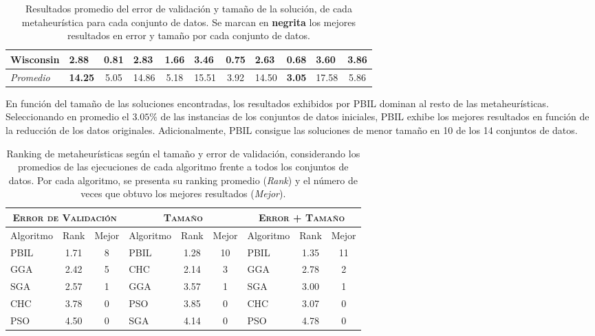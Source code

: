 \begin{table}[h!]
\begin{tabular}{l g c g c g c g c g c}
Wisconsin    &  2.88 &  0.81 &  2.83 & 1.66 &  3.46 & 0.75 & \textbf{2.63} & \textbf{0.68} &  3.60 &  3.86 \\
\hline
\emph{Promedio} & \textbf{14.25} & 5.05 & 14.86 & 5.18 & 15.51 & 3.92 & 14.50 & \textbf{3.05} & 17.58 & 5.86\\
\hline
\end{tabular}
\caption[Resultados promedio por metaheurística y conjunto de datos]{Resultados promedio del error de validación y tamaño de la solución, de cada metaheurística para cada conjunto de datos. Se marcan en \textbf{negrita} los mejores resultados en error y tamaño por cada conjunto de datos.}
\label{res-all}
\end{table}

En función del tamaño de las soluciones encontradas, los resultados exhibidos por PBIL dominan al resto de las metaheurísticas. Seleccionando en promedio el $3.05\%$ de las instancias de los conjuntos de datos iniciales, PBIL exhibe los mejores resultados en función de la reducción de los datos originales. Adicionalmente, PBIL consigue las soluciones de menor tamaño en 10 de los 14 conjuntos de datos.

\begin{table}[h!]
\centering
\begin{tabular}{l c c|l c c|l c c}
\hline
\multicolumn{3}{c|}{\textsc{Error de Validación}}
	& \multicolumn{3}{c|}{\textsc{Tamaño}}
	& \multicolumn{3}{c}{\textsc{Error + Tamaño}} \\
\hline
Algoritmo & Rank & Mejor & Algoritmo & Rank & Mejor & Algoritmo & Rank & Mejor \\
\hline
\hline
PBIL & 1.71 & 8 & PBIL & 1.28 & 10 & PBIL & 1.35 & 11 \\
GGA  & 2.42 & 5 & CHC  & 2.14 &  3 & GGA  & 2.78 &  2 \\
SGA  & 2.57 & 1 & GGA  & 3.57 &  1 & SGA  & 3.00 &  1 \\
CHC  & 3.78 & 0 & PSO  & 3.85 &  0 & CHC  & 3.07 &  0 \\
PSO  & 4.50 & 0 & SGA  & 4.14 &  0 & PSO  & 4.78 &  0 \\
\hline
\end{tabular}
\caption[Ranking de metaheurísticas usando todos los conjuntos de datos]{Ranking de metaheurísticas según el tamaño y error de validación, considerando los promedios de las ejecuciones de cada algoritmo frente a todos los conjuntos de datos. Por cada algoritmo, se presenta su ranking promedio (\emph{Rank}) y el número de veces que obtuvo los mejores resultados (\emph{Mejor}).}
\label{res-all-rank}
\end{table}

